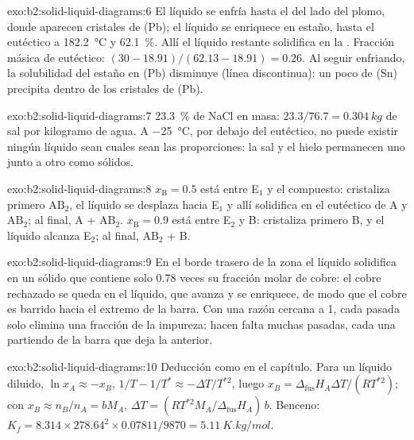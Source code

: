 \begin{solution}{exo:b2:solid-liquid-diagrams:6}
El líquido se enfría hasta el  del lado del plomo, donde aparecen cristales de (Pb); el
líquido se enriquece en estaño, hasta el eutéctico a \qty{182.2}{\degreeCelsius}
y 62.1~\%. Allí el líquido restante solidifica en la .
Fracción másica de eutéctico: $(30 - 18.91)/(62.13 - 18.91) = 0.26$. Al seguir
enfriando, la solubilidad del estaño en (Pb) disminuye (línea discontinua): un poco de (Sn)
precipita dentro de los cristales de (Pb).
\end{solution}

\begin{solution}{exo:b2:solid-liquid-diagrams:7}
23.3~\% de NaCl en masa: $23.3/76.7 = \qty{0.304}{kg}$ de sal por kilogramo de
agua. A \qty{-25}{\degreeCelsius}, por debajo del eutéctico, no puede existir ningún líquido
sean cuales sean las proporciones: la sal y el hielo permanecen uno junto a otro como sólidos.
\end{solution}

\begin{solution}{exo:b2:solid-liquid-diagrams:8}
$x_{\mathrm B} = 0.5$ está entre E$_1$ y el compuesto: cristaliza primero $\mathrm{AB_2}$,
el líquido se desplaza hacia E$_1$ y allí solidifica en el
eutéctico de A y $\mathrm{AB_2}$; al final, A + $\mathrm{AB_2}$.
$x_{\mathrm B} = 0.9$ está entre E$_2$ y B: cristaliza primero B, y el líquido
alcanza E$_2$; al final, $\mathrm{AB_2}$ + B.
\end{solution}

\begin{solution}{exo:b2:solid-liquid-diagrams:9}
En el borde trasero de la zona el líquido solidifica en un sólido que contiene solo 0.78
veces su fracción molar de cobre: el cobre rechazado se queda en el líquido, que
avanza y se enriquece, de modo que el cobre es barrido hacia el extremo de la barra.
Con una razón cercana a 1, cada pasada solo elimina una fracción de la impureza:
hacen falta muchas pasadas, cada una partiendo de la barra que deja la anterior.
\end{solution}

\begin{solution}{exo:b2:solid-liquid-diagrams:10}
Deducción como en el capítulo. Para un líquido diluido, $\ln x_A \approx -x_B$, $1/T -
1/T^* \approx -\Delta T/T^{*2}$, luego $x_B = \Delta_{\text{fus}}H_A\Delta T/(RT^{*2})$;
con $x_B \approx n_B/n_A = bM_A$, $\Delta T = (RT^{*2}M_A/\Delta_{\text{fus}}H_A)\,b$.
Benceno: $K_f = 8.314 \times 278.64^2 \times 0.07811/9870 = \qty{5.11}{K.kg/mol}$.
\end{solution}

